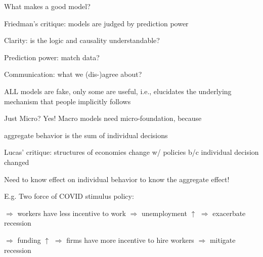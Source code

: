 \documentclass[11pt,aspectratio=169,usenames,dvipsnames]{beamer}
\let\tempone\itemize
\let\temptwo\enditemize
\renewenvironment{itemize}{\tempone\addtolength{\itemsep}{\fill}}{\temptwo}
\let\tempa\enumerate
\let\tempb\endenumerate
\renewenvironment{enumerate}{\tempa\addtolength{\itemsep}{\fill}}{\tempb}
\begin{document}
\begin{frame}{What makes a good model?}
\label{slide:What_makes_a_good_model_}
    \begin{center}
        \alert{Friedman's critique}: models are judged by \alert{prediction power}
    \end{center}
    \begin{itemize}
        \item Clarity: is the logic and causality understandable?
        \item Prediction power: match data?
        \item Communication: what we (dis-)agree about?
    \end{itemize}

    \vspace{0.7em}

    ALL models are fake, only some are useful, i.e., elucidates the \alert{underlying mechanism} that people implicitly follows

\end{frame}


\begin{frame}{Just Micro?}
\label{slide:Just_Micro_}
    \alert{Yes!} Macro models need micro-foundation, because
    \begin{itemize}
        \item aggregate behavior is the sum of individual decisions
        \item \alert{Lucas' critique}: structures of economies \alert{change} w/ policies b/c \alert{individual decision} changed
        \item Need to know effect on \alert{individual behavior} to know the aggregate effect!
        \item E.g. Two force of COVID stimulus policy:
        \begin{enumerate}
            \item $ \Rightarrow  $ workers have \alert{less} incentive to work $ \Rightarrow  $ unemployment $ \uparrow  $ $ \Rightarrow  $ exacerbate recession
            \item $ \Rightarrow  $ funding $ \uparrow  $ $ \Rightarrow  $ firms have \alert{more} incentive to hire workers $ \Rightarrow  $ mitigate recession
        \end{enumerate}
    \end{itemize}
\end{frame}

\appendix

% 
% 
\end{document}
